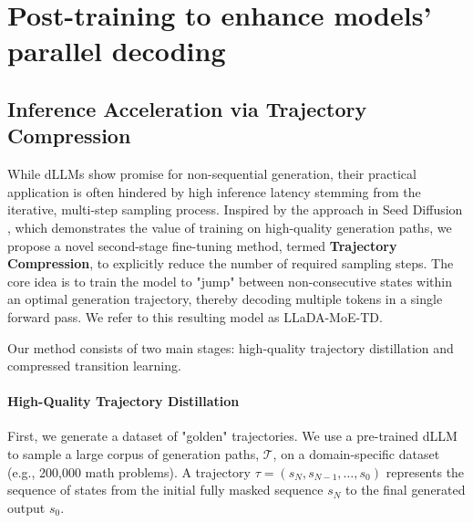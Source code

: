 \documentclass[]{antgroup}
\newcommand{\lladamoe}{LLaDA-MoE}
\begin{document}

\section{Post-training to enhance models' parallel decoding}

\subsection{Inference Acceleration via Trajectory Compression} \label{sec:TD}

While dLLMs show promise for non-sequential generation, their practical application is often hindered by high inference latency stemming from the iterative, multi-step sampling process. Inspired by the approach in Seed Diffusion \citep{song2025seed}, which demonstrates the value of training on high-quality generation paths, we propose a novel second-stage fine-tuning method, termed \textbf{Trajectory Compression}, to explicitly reduce the number of required sampling steps. The core idea is to train the model to "jump" between non-consecutive states within an optimal generation trajectory, thereby decoding multiple tokens in a single forward pass. We refer to this resulting model as \lladamoe-TD.

Our method consists of two main stages: high-quality trajectory distillation and compressed transition learning.

\paragraph{High-Quality Trajectory Distillation}
First, we generate a dataset of "golden" trajectories. We use a pre-trained dLLM to sample a large corpus of generation paths, $\mathcal{T}$, on a domain-specific dataset (e.g., 200,000 math problems). A trajectory $\tau = (s_N, s_{N-1}, \dots, s_0)$ represents the sequence of states from the initial fully masked sequence $s_N$ to the final generated output $s_0$.
\end{document}
